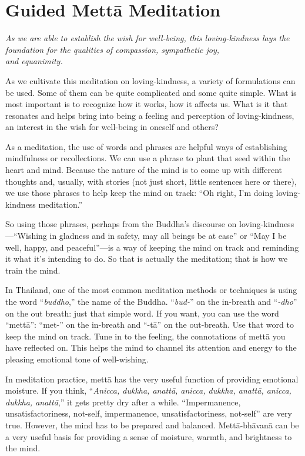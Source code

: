 \chapter{Guided Mettā Meditation}

\epigraph{\emph{As we are able to establish the wish for well-being,
this loving-kindness lays the foundation for the qualities of
compassion, sympathetic joy,\\and equanimity.}}{}

As we cultivate this meditation on loving-kindness, a variety of
formulations can be used. Some of them can be quite complicated and some
quite simple. What is most important is to recognize how it works, how
it affects us. What is it that resonates and helps bring into being a
feeling and perception of loving-kindness, an interest in the wish for
well-being in oneself and others?

As a meditation, the use of words and phrases are helpful ways of
establishing mindfulness or recollections. We can use a phrase to plant
that seed within the heart and mind. Because the nature of the mind is
to come up with different thoughts and, usually, with stories (not just
short, little sentences here or there), we use those phrases to help
keep the mind on track: “Oh right, I’m doing loving-kindness
meditation.”

So using those phrases, perhaps from the Buddha’s discourse on
loving-kindness—“Wishing in gladness and in safety, may all beings be at
ease” or “May I be well, happy, and peaceful”—is a way of keeping the
mind on track and reminding it what it’s intending to do. So that is
actually the meditation; that is how we train the mind.

In Thailand, one of the most common meditation methods or techniques is
using the word “\emph{buddho},” the name of the Buddha. “\emph{bud-}” on
the in-breath and “\emph{-dho}” on the out breath: just that simple
word. If you want, you can use the word “mettā”: “met-” on the in-breath
and “-tā” on the out-breath. Use that word to keep the mind on track.
Tune in to the feeling, the connotations of mettā you have reflected on.
This helps the mind to channel its attention and energy to the pleasing
emotional tone of well-wishing.

In meditation practice, mettā has the very useful function of providing
emotional moisture. If you think, “\emph{Anicca, dukkha, anattā, anicca,
dukkha, anattā, anicca, dukkha, anattā},” it gets pretty dry after a
while. “Impermanence, unsatisfactoriness, not-self, impermanence,
unsatisfactoriness, not-self” are very true. However, the mind has to be
prepared and balanced. Mettā-bhāvanā can be a very useful basis for
providing a sense of moisture, warmth, and brightness to the mind.

